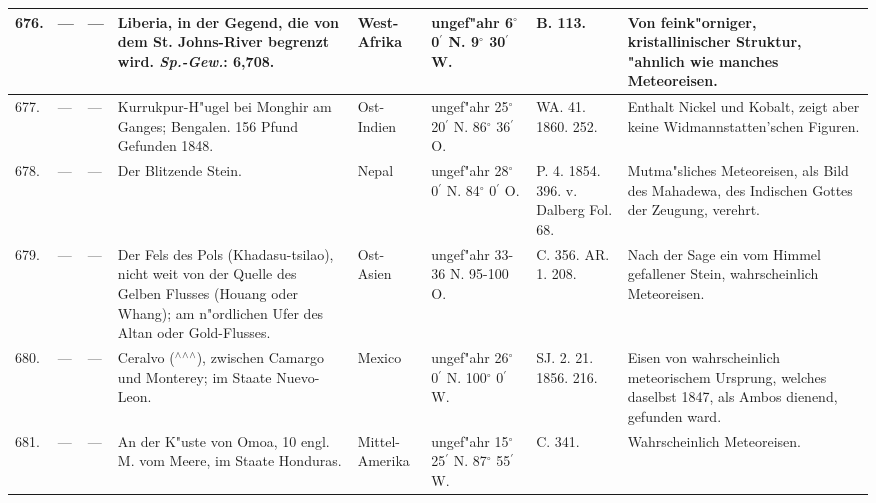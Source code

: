 \documentclass[a4paper, 8pt, oneside, polutonikogreek, german]{article}
\begin{document}
\begin{center}
\begin{longtable}{| p{4mm} | p{2mm} | p{15mm} | p{25mm} | p{16mm} | p{12mm} | p{13mm} | p{20mm} |}
        676. & --- & --- & Liberia, in der Gegend, die von dem St. Johns-River begrenzt wird. \emph{Sp.-Gew.}: 6,708. & West-Afrika & ungef"ahr 6$^\circ$ 0$^\prime$ N. 9$^\circ$ 30$^\prime$ W. & B. 113. & Von feink"orniger, kristallinischer Struktur, "ahnlich wie manches Meteoreisen. \\ \hline
        677. & --- & --- & Kurrukpur-H"ugel bei Monghir am Ganges; Bengalen. 156 Pfund Gefunden 1848. & Ost-Indien & ungef"ahr 25$^\circ$ 20$^\prime$ N. 86$^\circ$ 36$^\prime$ O. & WA. 41. 1860. 252. & Enthalt Nickel und Kobalt, zeigt aber keine Widmannstatten'schen Figuren. \\ \hline
        678. & --- & --- & Der Blitzende Stein. & Nepal & ungef"ahr 28$^\circ$ 0$^\prime$ N. 84$^\circ$ 0$^\prime$ O. & P. 4. 1854. 396. v. Dalberg Fol. 68. & Mutma"sliches Meteoreisen, als Bild des Mahadewa, des Indischen Gottes der Zeugung, verehrt. \\ \hline
        679. & --- & --- & Der Fels des Pols (Khadasu-tsilao), nicht weit von der Quelle des Gelben Flusses (Houang oder Whang); am n"ordlichen Ufer des Altan oder Gold-Flusses. & Ost-Asien & ungef"ahr 33-36 N. 95-100 O. & C. 356. AR. 1. 208. & Nach der Sage ein vom Himmel gefallener Stein, wahrscheinlich Meteoreisen. \\ \hline
        680. & --- & --- & Ceralvo ($^\wedge$$^\wedge$$^\wedge$), zwischen Camargo und Monterey; im Staate Nuevo-Leon. & Mexico & ungef"ahr 26$^\circ$ 0$^\prime$ N. 100$^\circ$ 0$^\prime$ W. & SJ. 2. 21. 1856. 216. & Eisen von wahrscheinlich meteorischem Ursprung, welches daselbst 1847, als Ambos dienend, gefunden ward. \\ \hline
        681. & --- & --- & An der K"uste von Omoa, 10 engl. M. vom Meere, im Staate Honduras. & Mittel-Amerika & ungef"ahr 15$^\circ$ 25$^\prime$ N. 87$^\circ$ 55$^\prime$ W. & C. 341. & Wahrscheinlich Meteoreisen. \\ \hline
    \end{longtable}
\end{center}
\clearpage
\end{document}
